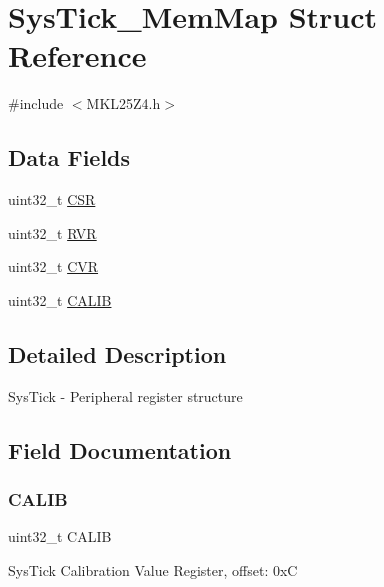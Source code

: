\hypertarget{struct_sys_tick___mem_map}{}\section{Sys\+Tick\+\_\+\+Mem\+Map Struct Reference}
\label{struct_sys_tick___mem_map}


{\ttfamily \#include $<$M\+K\+L25\+Z4.\+h$>$}

\subsection*{Data Fields}
\begin{DoxyCompactItemize}
\item 
uint32\+\_\+t \hyperlink{struct_sys_tick___mem_map_a9f762945117456968eec12c384b1b4e1}{C\+SR}
\item 
uint32\+\_\+t \hyperlink{struct_sys_tick___mem_map_a46baf65a2506b0376fe5d5e76576817e}{R\+VR}
\item 
uint32\+\_\+t \hyperlink{struct_sys_tick___mem_map_a9a64e88c06e0550ec009f2510db2bd58}{C\+VR}
\item 
uint32\+\_\+t \hyperlink{struct_sys_tick___mem_map_a95f06de3371ee421b89d4be2aae51561}{C\+A\+L\+IB}
\end{DoxyCompactItemize}


\subsection{Detailed Description}
Sys\+Tick -\/ Peripheral register structure 

\subsection{Field Documentation}
\mbox{\label{struct_sys_tick___mem_map_a95f06de3371ee421b89d4be2aae51561}} 
\subsubsection{\texorpdfstring{C\+A\+L\+IB}{CALIB}}
{\footnotesize\ttfamily uint32\+\_\+t C\+A\+L\+IB}

Sys\+Tick Calibration Value Register, offset\+: 0xC \mbox{\label{struct_sys_tick___mem_map_a9f762945117456968eec12c384b1b4e1}} 
